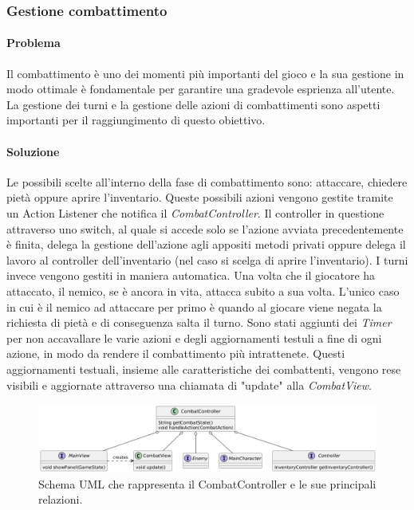 \documentclass[a4paper,12pt]{report}
\begin{document}
\subsubsection{Gestione combattimento}

\paragraph{Problema} Il combattimento è uno dei momenti più importanti del gioco e la sua gestione 
in modo ottimale è fondamentale per garantire una gradevole esprienza all'utente. La gestione dei turni e la 
gestione delle azioni di combattimenti sono aspetti importanti per il raggiungimento di questo obiettivo.
\paragraph{Soluzione} Le possibili scelte all'interno della fase di combattimento sono: attaccare, chiedere pietà oppure
aprire l'inventario. Queste possibili azioni vengono gestite tramite un Action Listener che notifica
il \textit{CombatController}. Il controller in questione attraverso uno switch, al quale si accede solo se l'azione avviata
precedentemente è finita, delega la gestione dell'azione agli appositi metodi privati oppure delega il lavoro al controller
dell'inventario (nel caso si scelga di aprire l'inventario). 
I turni invece vengono gestiti in maniera automatica. Una volta che il giocatore ha attaccato, il nemico, se è ancora in vita, 
attacca subito a sua volta. L'unico caso in cui è il nemico ad attaccare per primo è quando al giocare viene negata
la richiesta di pietà e di conseguenza salta il turno.
Sono stati aggiunti dei \textit{Timer} per non accavallare le varie azioni e degli aggiornamenti testuli a fine di ogni azione, in modo da
rendere il combattimento più intrattenete. Questi aggiornamenti testuali, insieme alle caratteristiche dei combattenti, vengono
rese visibili e aggiornate attraverso una chiamata di "update" alla \textit{CombatView}. 
\begin{figure}[H]
	\centering{}
	\includegraphics[width=\textwidth]{img/combatController.png}
	\caption{Schema UML che rappresenta il CombatController e le sue principali relazioni.}
	\label{img:combatController}
\end{figure}
\end{document}
